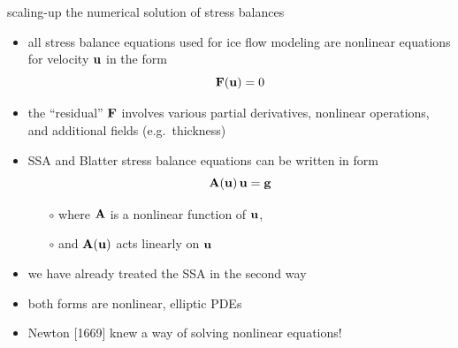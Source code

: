 \begin{frame}{scaling-up the numerical solution of stress balances}

\begin{itemize}
\item all stress balance equations used for ice flow modeling are nonlinear equations for velocity $\mathbf{u}$ in the form
	$$\mathbf{F}(\mathbf{u}) = 0$$
\vspace{-0.1in}
\item the ``residual'' $\mathbf{F}$ involves various partial derivatives, nonlinear operations, and additional fields (e.g.~thickness)
\item SSA and Blatter stress balance equations can be written in form
	 $$\mathbf{A}(\mathbf{u})\,\mathbf{u} = \mathbf{g}$$
\vspace{-0.15in}
  \begin{itemize}
  \item[$\circ$]  where $\mathbf{A}$ is a nonlinear function of $\mathbf{u}$,
  \item[$\circ$]  and $\mathbf{A}(\mathbf{u})$ acts linearly on $\mathbf{u}$
  \end{itemize}
\item we have already treated the SSA in the second way
\item both forms are nonlinear, elliptic PDEs
\item Newton [1669] knew a way of solving nonlinear equations!
\end{itemize}
\end{frame}


